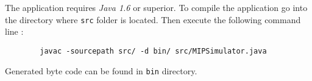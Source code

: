 
	The application requires \textit{Java 1.6} or superior. To compile the application go into the directory where \verb?src? folder is located. Then execute the following command line :
	\begin{verbatim}
		javac -sourcepath src/ -d bin/ src/MIPSimulator.java
	\end{verbatim}	
	
	Generated byte code can be found in \verb?bin? directory.